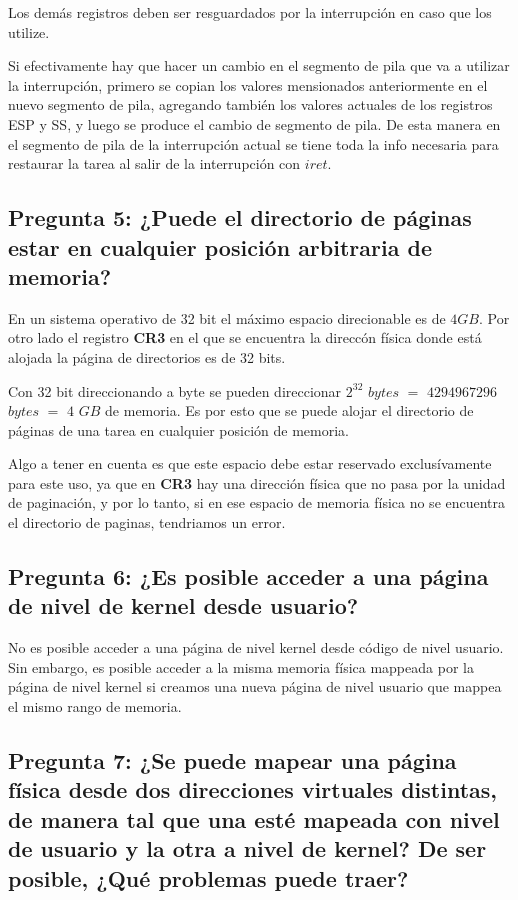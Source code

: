 \documentclass[a4paper,10pt,twoside]{article}
\begin{document}
Los demás registros deben ser resguardados por la interrupción en caso que los utilize.

Si efectivamente hay que hacer un cambio en el segmento de pila que va a utilizar la interrupción, primero se copian los valores mensionados anteriormente en el nuevo segmento de pila, agregando también los valores actuales de los registros ESP y SS, y luego se produce el cambio de segmento de pila. De esta manera en el segmento de pila de la interrupción actual se tiene toda la info necesaria para restaurar la tarea al salir de la interrupción con $iret$.


\subsection{Pregunta 5: ¿Puede el directorio de páginas estar en cualquier posición arbitraria de memoria?}
En un sistema operativo de 32 bit el máximo espacio direcionable es de $4GB$. Por otro lado el registro \textbf{CR3} en el que se encuentra la direccón física donde está alojada la página de directorios es de 32 bits. 

Con 32 bit direccionando a byte se pueden direccionar $2^{32}$ $bytes$ $=$ $4294967296$ $bytes$ $=$ $4$ $GB$ de memoria. Es por esto que se puede alojar el directorio de páginas de una tarea en cualquier posición de memoria. 

Algo a tener en cuenta es que este espacio debe estar reservado exclusívamente para este uso, ya que en \textbf{CR3} hay una dirección física que no pasa por la unidad de paginación, y por lo tanto, si en ese espacio de memoria física no se encuentra el directorio de paginas, tendriamos un error.


\subsection{Pregunta 6: ¿Es posible acceder a una página de nivel de kernel desde usuario?}

No es posible acceder a una página de nivel kernel desde código de nivel usuario. Sin embargo, es posible acceder a la misma memoria física mappeada por la página de nivel kernel si creamos una nueva página de nivel usuario que mappea el mismo rango de memoria.


\subsection{Pregunta 7: ¿Se puede mapear una página física desde dos direcciones virtuales distintas, de manera tal que una esté mapeada con nivel de usuario y la otra a nivel de kernel? De ser posible, ¿Qué problemas puede traer?}
\end{document}
